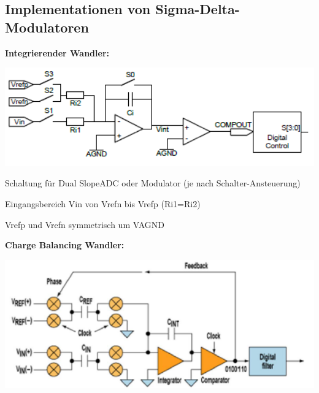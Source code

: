 \subsection{Implementationen von Sigma-Delta-Modulatoren}
\textbf{Integrierender Wandler:}\\
\begin{minipage}{0.55\textwidth}
    \includegraphics[width=1.0\textwidth]{images/IntegrierenderWandler}
\end{minipage}
\hfill
\begin{minipage}{0.40\textwidth}
    \begin{compactitem}
        \item Schaltung für Dual SlopeADC oder Modulator (je nach Schalter-Ansteuerung)
        \item Eingangsbereich Vin von Vrefn bis Vrefp (Ri1=Ri2)
        \item Vrefp und Vrefn symmetrisch um VAGND
    \end{compactitem}
\end{minipage}
\textbf{Charge Balancing Wandler:}\\
\begin{minipage}{0.55\textwidth}
    \includegraphics[width=1.0\textwidth]{images/ChargeBalancing}
\end{minipage}
\hfill

